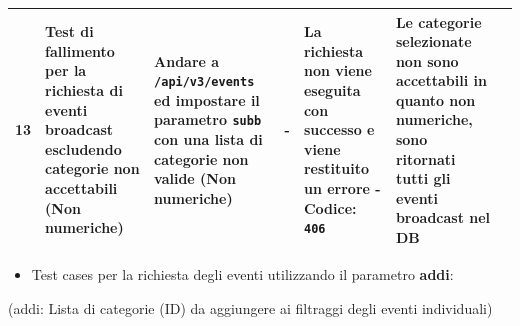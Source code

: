 \documentclass{article}
\begin{document}
\begin{table}[htbp]
\begin{tabularx}{\textwidth}{| r | X | X | X | X | X | X |}
        \hline
        13 & Test di fallimento per la richiesta di eventi broadcast escludendo categorie non accettabili (Non numeriche) & Andare a \texttt{/api/v3/events} ed impostare il parametro \texttt{subb} con una lista di categorie non valide (Non numeriche) & - & La richiesta non viene eseguita con successo e viene restituito un errore - Codice: \texttt{406} & Le categorie selezionate non sono accettabili in quanto non numeriche, sono ritornati tutti gli eventi broadcast nel DB \\
        \hline
    \end{tabularx}
\end{table}

\clearpage

\begin{itemize}
    \item Test cases per la richiesta degli eventi utilizzando il parametro \textbf{addi}:
\end{itemize}
(addi: Lista di categorie (ID) da aggiungere ai filtraggi degli eventi individuali)
\end{document}
